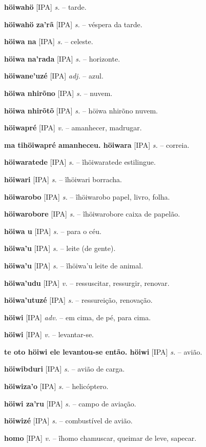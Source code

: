 \textbf{höiwahö} [IPA] \textit{s.} -- tarde.

\textbf{höiwahö za'rã} [IPA] \textit{s.} -- véspera da tarde.

\textbf{höiwa na} [IPA] \textit{s.} -- celeste.

\textbf{höiwa na'rada} [IPA] \textit{s.} -- horizonte.

\textbf{höiwane'uzé} [IPA] \textit{adj.} -- azul.

\textbf{höiwa nhirõno} [IPA] \textit{s.} -- nuvem.

\textbf{höiwa nhirõtõ} [IPA] \textit{s.} -- höiwa nhirõno nuvem.

\textbf{höiwapré} [IPA] \textit{v.} -- amanhecer, madrugar.

\textbf{ma tihöiwapré amanheceu. höiwara} [IPA] \textit{s.} -- correia.

\textbf{höiwaratede} [IPA] \textit{s.} -- ĩhöiwaratede estilingue.

\textbf{höiwari} [IPA] \textit{s.} -- ĩhöiwari borracha.

\textbf{höiwarobo} [IPA] \textit{s.} -- ĩhöiwarobo papel, livro, folha.

\textbf{höiwarobore} [IPA] \textit{s.} -- ĩhöiwarobore caixa de papelão.

\textbf{höiwa u} [IPA] \textit{s.} -- para o céu.

\textbf{höiwa'u} [IPA] \textit{s.} -- leite (de gente).

\textbf{höiwa'u} [IPA] \textit{s.} -- ĩhöiwa'u leite de animal.

\textbf{höiwa'udu} [IPA] \textit{v.} -- ressuscitar, ressurgir, renovar.

\textbf{höiwa'utuzé} [IPA] \textit{s.} -- ressureição, renovação.

\textbf{höiwi} [IPA] \textit{adv.} -- em cima, de pé, para cima.

\textbf{höiwi} [IPA] \textit{v.} -- levantar-se.

\textbf{te oto höiwi ele levantou-se então. höiwi} [IPA] \textit{s.} -- avião.

\textbf{höiwibduri} [IPA] \textit{s.} -- avião de carga.

\textbf{höiwiza'o} [IPA] \textit{s.} -- helicóptero.

\textbf{höiwi za'ru} [IPA] \textit{s.} -- campo de aviação.

\textbf{höiwizé} [IPA] \textit{s.} -- combustível de avião.

\textbf{homo} [IPA] \textit{v.} -- ĩhomo chamuscar, queimar de leve, sapecar.

